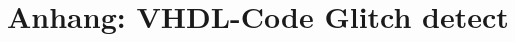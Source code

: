 \chapter{Anhang: VHDL-Code Glitch detect }\label{chap.anhang_2.vhdl_glitch}
%
%
%
%
%
%
%
%
%
%
%
%
%
%
%
%
%		
%
%	
%
%	
